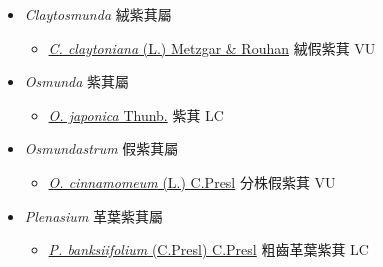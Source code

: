 
  \begin{itemize}
 \item[    ] \textit{Claytosmunda} 絨紫萁屬
                                
  \begin{itemize}
        \item[] \href{http://www.theplantlist.org/tpl1.1/search?q=Claytosmunda+claytoniana}{\textit{C. claytoniana} (L.) Metzgar \& Rouhan}   絨假紫萁   VU
  \end{itemize}
 \item[    ] \textit{Osmunda} 紫萁屬
                                
  \begin{itemize}
        \item[] \href{http://www.theplantlist.org/tpl1.1/search?q=Osmunda+japonica}{\textit{O. japonica} Thunb.}   紫萁   LC
  \end{itemize}
 \item[    ] \textit{Osmundastrum} 假紫萁屬
                                
  \begin{itemize}
        \item[] \href{http://www.theplantlist.org/tpl1.1/search?q=Osmundastrum+cinnamomeum}{\textit{O. cinnamomeum} (L.) C.Presl}   分株假紫萁   VU
  \end{itemize}
 \item[    ] \textit{Plenasium} 革葉紫萁屬
                                
  \begin{itemize}
        \item[] \href{http://www.theplantlist.org/tpl1.1/search?q=Plenasium+banksiifolium}{\textit{P. banksiifolium} (C.Presl) C.Presl}   粗齒革葉紫萁   LC
  \end{itemize}
  \end{itemize}
